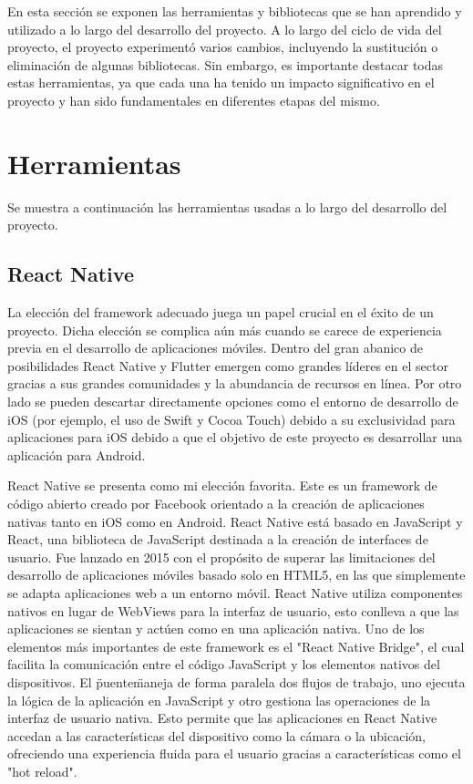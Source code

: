 
En esta sección se exponen las herramientas y bibliotecas que se han aprendido y utilizado a lo largo del desarrollo del proyecto.
A lo largo del ciclo de vida del proyecto, el proyecto experimentó varios cambios, incluyendo la sustitución o eliminación de algunas bibliotecas. Sin embargo, es importante destacar todas estas herramientas, ya que cada una ha tenido un impacto significativo en el proyecto y han sido fundamentales en diferentes etapas del mismo.

\section{Herramientas}

Se muestra a continuación las herramientas usadas a lo largo del desarrollo del proyecto.

\subsection{React Native}

La elección del framework adecuado juega un papel crucial en el éxito de un proyecto. Dicha elección se complica aún más cuando se carece de experiencia previa en el desarrollo de aplicaciones móviles. Dentro del gran abanico de posibilidades React Native y Flutter emergen como grandes líderes en el sector gracias a sus grandes comunidades y la abundancia de recursos en línea. Por otro lado se pueden descartar directamente opciones como el entorno de desarrollo de iOS (por ejemplo, el uso de Swift y Cocoa Touch) debido a su exclusividad para aplicaciones para iOS debido a que el objetivo de este proyecto es desarrollar una aplicación para Android.

React Native se presenta como mi elección favorita. Este es un framework de código abierto creado por Facebook orientado a la creación de aplicaciones nativas tanto en iOS como en Android. React Native está basado en JavaScript y React, una biblioteca de JavaScript destinada a la creación de interfaces de usuario. Fue lanzado en 2015 con el propósito de superar las limitaciones del desarrollo de aplicaciones móviles basado solo en HTML5, en las que simplemente se adapta aplicaciones web a un entorno móvil. React Native utiliza componentes nativos en lugar de WebViews para la interfaz de usuario, esto conlleva a que las aplicaciones se sientan y actúen como en una aplicación nativa.
Uno de los elementos más importantes de este framework es el "React Native Bridge", el cual facilita la comunicación entre el código JavaScript y los elementos nativos del dispositivos. El \"puente\" maneja de forma paralela dos flujos de trabajo, uno ejecuta la lógica de la aplicación en JavaScript y otro gestiona las operaciones de la interfaz de usuario nativa. Esto permite que las aplicaciones en React Native accedan a las características del dispositivo como la cámara o la ubicación, ofreciendo una experiencia fluida para el usuario gracias a características como el "hot reload".

